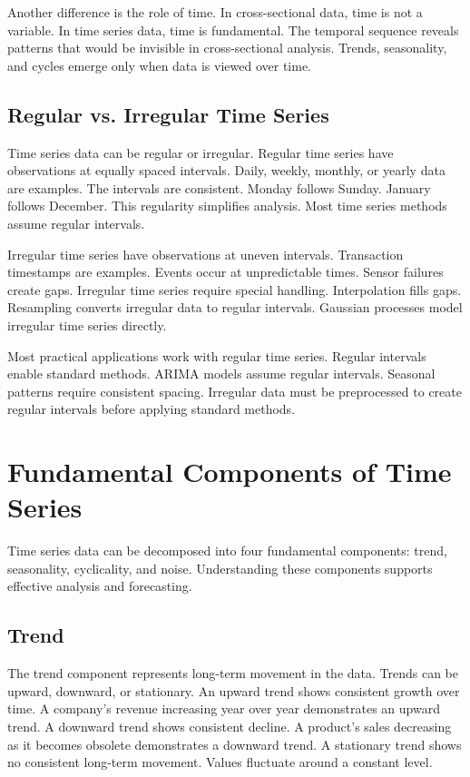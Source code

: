Another difference is the role of time. In cross-sectional data, time is not a variable. In time series data, time is fundamental. The temporal sequence reveals patterns that would be invisible in cross-sectional analysis. Trends, seasonality, and cycles emerge only when data is viewed over time.

\subsection{Regular vs. Irregular Time Series}

Time series data can be regular or irregular. Regular time series have observations at equally spaced intervals. Daily, weekly, monthly, or yearly data are examples. The intervals are consistent. Monday follows Sunday. January follows December. This regularity simplifies analysis. Most time series methods assume regular intervals.

Irregular time series have observations at uneven intervals. Transaction timestamps are examples. Events occur at unpredictable times. Sensor failures create gaps. Irregular time series require special handling. Interpolation fills gaps. Resampling converts irregular data to regular intervals. Gaussian processes model irregular time series directly.

Most practical applications work with regular time series. Regular intervals enable standard methods. ARIMA models assume regular intervals. Seasonal patterns require consistent spacing. Irregular data must be preprocessed to create regular intervals before applying standard methods.

\section{Fundamental Components of Time Series}

Time series data can be decomposed into four fundamental components: trend, seasonality, cyclicality, and noise. Understanding these components supports effective analysis and forecasting.

\subsection{Trend}

The trend component represents long-term movement in the data. Trends can be upward, downward, or stationary. An upward trend shows consistent growth over time. A company's revenue increasing year over year demonstrates an upward trend. A downward trend shows consistent decline. A product's sales decreasing as it becomes obsolete demonstrates a downward trend. A stationary trend shows no consistent long-term movement. Values fluctuate around a constant level.

